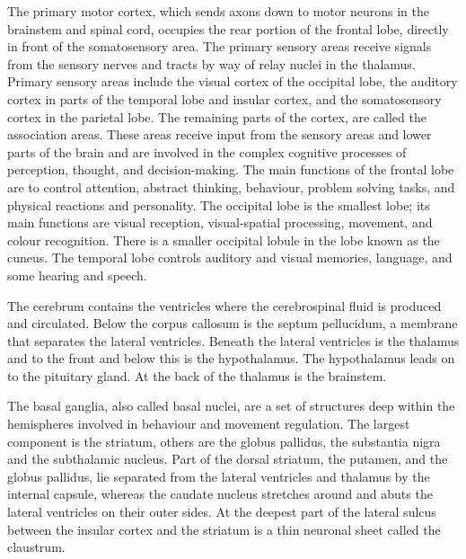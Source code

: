 \documentclass[]{book}
\begin{document}
The primary motor cortex, which sends axons down to motor neurons in the brainstem and spinal cord, occupies the rear portion of the frontal lobe, directly in front of the somatosensory area. The primary sensory areas receive signals from the sensory nerves and tracts by way of relay nuclei in the thalamus. Primary sensory areas include the visual cortex of the occipital lobe, the auditory cortex in parts of the temporal lobe and insular cortex, and the somatosensory cortex in the parietal lobe. The remaining parts of the cortex, are called the association areas. These areas receive input from the sensory areas and lower parts of the brain and are involved in the complex cognitive processes of perception, thought, and decision-making. The main functions of the frontal lobe are to control attention, abstract thinking, behaviour, problem solving tasks, and physical reactions and personality. The occipital lobe is the smallest lobe; its main functions are visual reception, visual-spatial processing, movement, and colour recognition. There is a smaller occipital lobule in the lobe known as the cuneus. The temporal lobe controls auditory and visual memories, language, and some hearing and speech.

The cerebrum contains the ventricles where the cerebrospinal fluid is produced and circulated. Below the corpus callosum is the septum pellucidum, a membrane that separates the lateral ventricles. Beneath the lateral ventricles is the thalamus and to the front and below this is the hypothalamus. The hypothalamus leads on to the pituitary gland. At the back of the thalamus is the brainstem.

The basal ganglia, also called basal nuclei, are a set of structures deep within the hemispheres involved in behaviour and movement regulation. The largest component is the striatum, others are the globus pallidus, the substantia nigra and the subthalamic nucleus. Part of the dorsal striatum, the putamen, and the globus pallidus, lie separated from the lateral ventricles and thalamus by the internal capsule, whereas the caudate nucleus stretches around and abuts the lateral ventricles on their outer sides. At the deepest part of the lateral sulcus between the insular cortex and the striatum is a thin neuronal sheet called the claustrum.
\end{document}
